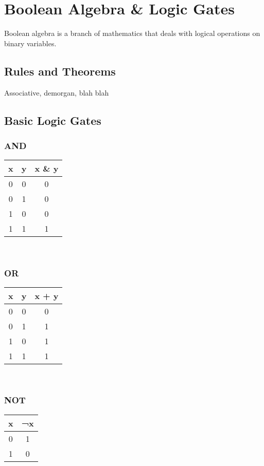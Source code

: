 \chapter{Boolean Algebra \& Logic Gates}

Boolean algebra is a branch of mathematics that deals with logical operations on binary variables.

\section{Rules and Theorems}

Associative, demorgan, blah blah

\section{Basic Logic Gates}

\subsection{AND}

\begin{tabular}{c c c}
	\hline
	\textbf{x} & \textbf{y} & \textbf{x \& y} \\ 
	\hline
	0 & 0 & 0 \\
	0 & 1 & 0 \\
	1 & 0 & 0 \\
	1 & 1 & 1 \\
	\hline 
\end{tabular} \\

\subsection{OR}

\begin{tabular}{c c c}
	\hline
	\textbf{x} & \textbf{y} & \textbf{x + y} \\ 
	\hline
	0 & 0 & 0 \\
	0 & 1 & 1 \\
	1 & 0 & 1 \\
	1 & 1 & 1 \\
	\hline 
\end{tabular} \\

\subsection{NOT}

\begin{tabular}{c c}
	\hline
	\textbf{x} & \textbf{¬x} \\ 
	\hline
	0 & 1  \\
	1 & 0  \\
	\hline 
\end{tabular} \\